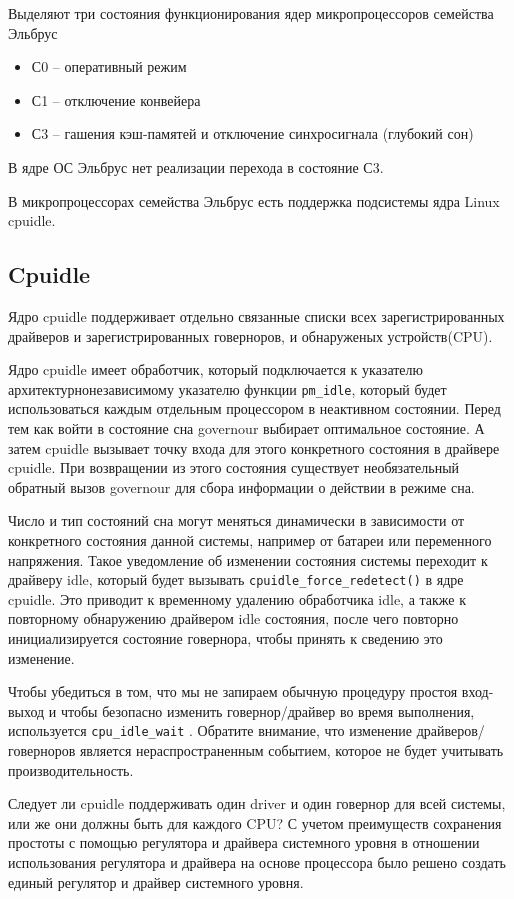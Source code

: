 \documentclass{article}
\begin{document}
Выделяют три состояния функционирования ядер микропроцессоров семейства Эльбрус
\begin{itemize}
\item С0 – оперативный режим
\item С1 – отключение конвейера
\item С3 – гашения кэш-памятей и отключение синхросигнала (глубокий сон)
\end{itemize}

В ядре ОС Эльбрус нет реализации перехода в состояние С3.

В микропроцессорах семейства Эльбрус есть поддержка подсистемы ядра Linux cpuidle.


\subsection{Cpuidle}
Ядро cpuidle поддерживает отдельно связанные списки всех зарегистрированных драйверов и зарегистрированных говерноров, и обнаруженых устройств(CPU).

Ядро cpuidle имеет обработчик, который подключается к указателю архитектурнонезависимому указателю функции \texttt{pm\_idle}, который будет использоваться каждым отдельным процессором в неактивном состоянии. Перед тем как войти в состояние сна governour выбирает оптимальное состояние. А затем cpuidle вызывает точку входа для этого конкретного состояния в драйвере cpuidle. При возвращении из этого состояния существует необязательный обратный вызов governour для сбора информации о действии в режиме сна.

Число и тип состояний сна могут меняться динамически в зависимости от конкретного состояния данной системы, например от батареи или переменного напряжения. Такое уведомление об изменении состояния системы переходит к драйверу idle, который будет вызывать \texttt{cpuidle\_force\_redetect()} в ядре cpuidle. Это приводит к временному удалению обработчика idle, а также к повторному обнаружению драйвером idle состояния, после чего повторно инициализируется состояние говернора, чтобы принять к сведению это изменение.

Чтобы убедиться в том, что мы не запираем обычную процедуру простоя вход-выход и чтобы безопасно изменить говернор/драйвер во время выполнения, используется \texttt{cpu\_idle\_wait} . Обратите внимание, что изменение драйверов/говерноров является нераспространенным событием, которое не будет учитывать производительность.

Следует ли cpuidle поддерживать один driver и один говернор для всей системы, или же они должны быть для каждого CPU?
С учетом преимуществ сохранения простоты с помощью регулятора и драйвера системного уровня в отношении использования регулятора и драйвера на основе процессора было решено создать единый регулятор и драйвер системного уровня.
\end{document}
